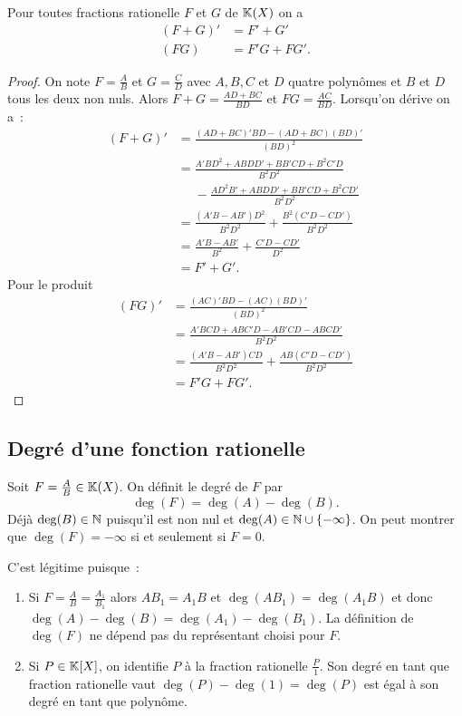 \begin{theo}
  Pour toutes fractions rationelle \(F\) et \(G\) de \(\mathbb{K}(X)\) on a
  \begin{align}
    (F+G)'&=F'+G' \\
    (FG)&=F'G+FG'.
  \end{align}
\end{theo}
\begin{proof}
  On note \(F=\frac{A}{B}\) et \(G=\frac{C}{D}\) avec \(A,B,C\) et \(D\) quatre polynômes et \(B\) et \(D\) tous les deux non nuls. Alors \(F+G=\frac{AD+BC}{BD}\) et \(FG=\frac{AC}{BD}\). Lorsqu'on dérive on a~:
  \begin{align}
    (F+G)' &= \frac{(AD+BC)'BD-(AD+BC)(BD)'}{(BD)^2}\\
    &=\frac{A'BD^2+ABDD'+BB'CD+B^2C'D}{B^2D^2}\\
    &\phantom{=}-\frac{AD^2B'+ABDD'+BB'CD+B^2CD'}{B^2D^2}\\
    &=\frac{(A'B-AB')D^2}{B^2D^2} +\frac{B^2(C'D-CD')}{B^2D^2} \\
    &=\frac{A'B-AB'}{B^2} +\frac{C'D-CD'}{D^2}\\
    &=F'+G'.
  \end{align}
  Pour le produit
  \begin{align}
    (FG)' &= \frac{(AC)'BD-(AC)(BD)'}{(BD)^2}\\
    &=\frac{A'BCD+ABC'D-AB'CD-ABCD'}{B^2D^2}\\
    &=\frac{(A'B-AB')CD}{B^2D^2} + \frac{AB(C'D-CD')}{B^2D^2}\\
    &=F'G +FG'.
  \end{align}
\end{proof}

\subsection{Degré d'une fonction rationelle}

\begin{defdef}
  Soit \(F=\frac{A}{B} \in \mathbb{K}(X)\). On définit le degré de \(F\) par
  \begin{equation}
    \deg(F)=\deg(A)-\deg(B).
  \end{equation}
  Déjà \(\deg(B) \in \mathbb{N}\) puisqu'il est non nul et \(\deg(A) \in \mathbb{N}\cup\{-\infty\}\). On peut montrer que \(\deg(F)=-\infty\) si et seulement si \(F=0\).
\end{defdef}

C'est légitime puisque~:
\begin{enumerate}
\item Si \(F=\frac{A}{B}=\frac{A_1}{B_1}\) alors \(AB_1=A_1B\) et \(\deg(AB_1)=\deg(A_1B)\) et donc \(\deg(A)-\deg(B)=\deg(A_1)-\deg(B_1)\). La définition de \(\deg(F)\) ne dépend pas du représentant choisi pour \(F\).
\item Si \(P\in\mathbb{K}[X]\), on identifie \(P\) à la fraction rationelle \(\frac{P}{1}\). Son degré en tant que fraction rationelle vaut \(\deg(P)-\deg(1)=\deg(P)\) est égal à son degré en tant que polynôme.
\end{enumerate}


